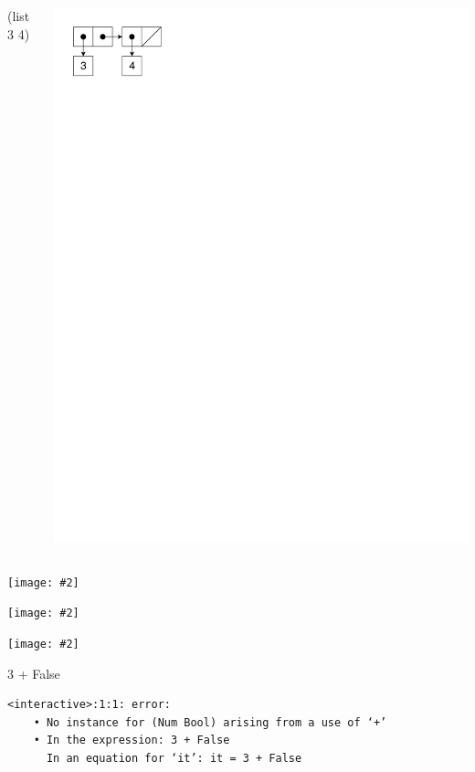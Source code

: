 \documentclass[UKenglish,usenames,dvipsnames,svgnames,table,aspectratio=169,mathserif]{beamer}
\newcommand{\nl}{\vspace{\baselineskip}}
\newcommand{\imageslide}[2][1]{{
\begin{frame}\begin{center}
\texttt{[image: \#2]}
\end{center}\end{frame}
}}
\begin{document}
\begin{frame}[fragile]
\begin{columns}[T]
\begin{schemecode}
  (list 3 4)
\end{schemecode}
\includegraphics{list-cons2.pdf}
\end{columns}
\end{frame}


\imageslide[0.7]{list-cons-racket.png}
\fi


\imageslide[1.3]{pushout1.pdf}
\imageslide[1.3]{pushout2.pdf}




\begin{frame}[fragile]

\Large
\begin{texttt}
3 + False
\end{texttt}
\nl

\large
\begin{block}{}
\begin{Verbatim}
<interactive>:1:1: error:
    • No instance for (Num Bool) arising from a use of ‘+’
    • In the expression: 3 + False
      In an equation for ‘it’: it = 3 + False
\end{Verbatim}
\end{block}
\end{frame}
\end{document}
